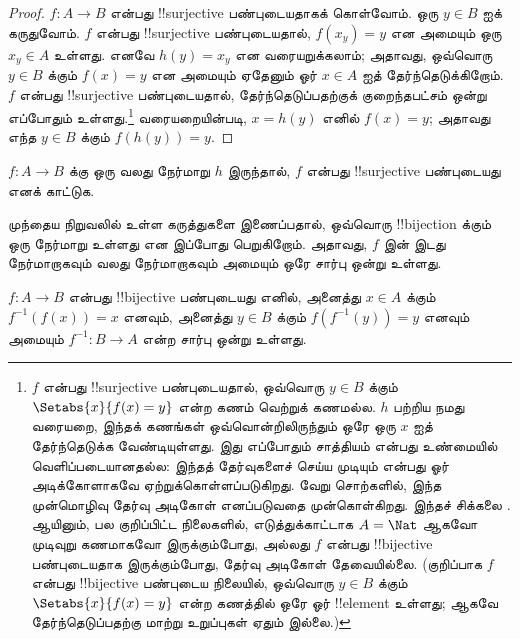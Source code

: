 \documentclass[../../../include/open-logic-section]{subfiles}
\begin{document}
\begin{proof}
$f\colon A \to B$ என்பது !!{surjective} பண்புடையதாகக் கொள்வோம்.
ஒரு $y \in
B$ ஐக் கருதுவோம். $f$ என்பது !!{surjective} பண்புடையதால்,
$f(x_y)
= y$ என அமையும் ஒரு $x_y \in A$ உள்ளது.
எனவே $h(y) = x_y$ என வரையறுக்கலாம்; அதாவது,
ஒவ்வொரு $y \in B$ க்கும் $f(x) = y$ என அமையும்
ஏதேனும் ஓர் $x \in A$ ஐத் தேர்ந்தெடுக்கிறோம்.
$f$ என்பது !!{surjective} பண்புடையதால், தேர்ந்தெடுப்பதற்குக்
குறைந்தபட்சம் ஒன்று எப்போதும் உள்ளது.\footnote{$f$ என்பது
!!{surjective} பண்புடையதால், ஒவ்வொரு $y \in B$ க்கும்
$\Setabs{x}{f(x) = y}$ என்ற கணம் வெற்றுக் கணமல்ல.
$h$ பற்றிய நமது வரையறை, இந்தக் கணங்கள் ஒவ்வொன்றிலிருந்தும்
ஒரே ஒரு $x$ ஐத் தேர்ந்தெடுக்க வேண்டியுள்ளது.
இது எப்போதும் சாத்தியம் என்பது உண்மையில் வெளிப்படையானதல்ல:
இந்தத் தேர்வுகளைச் செய்ய முடியும் என்பது ஓர் அடிக்கோளாகவே
ஏற்றுக்கொள்ளப்படுகிறது. வேறு சொற்களில், இந்த முன்மொழிவு
தேர்வு அடிகோள் எனப்படுவதை முன்கொள்கிறது.
இந்தச் சிக்கலை .
ஆயினும், பல குறிப்பிட்ட நிலைகளில், எடுத்துக்காட்டாக
$A = \Nat$ ஆகவோ முடிவுறு கணமாகவோ இருக்கும்போது,
அல்லது $f$ என்பது !!{bijective} பண்புடையதாக இருக்கும்போது,
தேர்வு அடிகோள் தேவையில்லை.
(குறிப்பாக $f$ என்பது !!{bijective} பண்புடைய நிலையில்,
ஒவ்வொரு $y \in B$ க்கும் $\Setabs{x}{f(x) = y}$ என்ற கணத்தில்
ஒரே ஓர் !!{element} உள்ளது; ஆகவே தேர்ந்தெடுப்பதற்கு
மாற்று உறுப்புகள் ஏதும் இல்லை.)}
வரையறையின்படி, $x = h(y)$ எனில் $f(x) = y$;
அதாவது எந்த $y \in B$ க்கும் $f(h(y)) = y$.
\end{proof}

\begin{prob}
$f\colon A \to B$ க்கு ஒரு வலது நேர்மாறு $h$ இருந்தால்,
$f$ என்பது !!{surjective} பண்புடையது எனக் காட்டுக.
\end{prob}

\begin{explain}
முந்தைய நிறுவலில் உள்ள கருத்துகளை இணைப்பதால்,
ஒவ்வொரு !!{bijection} க்கும் ஒரு நேர்மாறு உள்ளது என இப்போது பெறுகிறோம்.
அதாவது, $f$ இன் இடது நேர்மாறாகவும் வலது நேர்மாறாகவும்
அமையும் ஒரே சார்பு ஒன்று உள்ளது.
\end{explain}

\begin{prop}
$f\colon A \to B$ என்பது !!{bijective} பண்புடையது எனில்,
அனைத்து $x \in A$ க்கும் $f^{-1}(f(x)) = x$ எனவும்,
அனைத்து $y \in B$ க்கும் $f(f^{-1}(y)) = y$ எனவும் அமையும்
$f^{-1}\colon B \to A$ என்ற சார்பு ஒன்று உள்ளது.
\end{prop}
\end{document}
